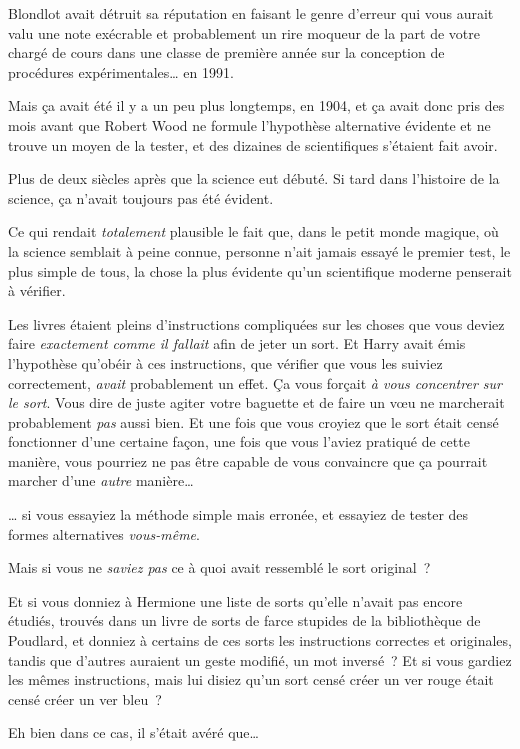 Blondlot avait détruit sa réputation en faisant le genre d'erreur qui vous aurait valu une note exécrable et probablement un rire moqueur de la part de votre chargé de cours dans une classe de première année sur la conception de procédures expérimentales… en 1991.

Mais ça avait été il y a un peu plus longtemps, en 1904, et ça avait donc pris des mois avant que Robert Wood ne formule l'hypothèse alternative évidente et ne trouve un moyen de la tester, et des dizaines de scientifiques s'étaient fait avoir.

Plus de deux siècles après que la science eut débuté.
Si tard dans l'histoire de la science, ça n'avait toujours pas été évident.

Ce qui rendait \emph{totalement} plausible le fait que, dans le petit monde magique, où la science semblait à peine connue, personne n'ait jamais essayé le premier test, le plus simple de tous, la chose la plus évidente qu'un scientifique moderne penserait à vérifier.

Les livres étaient pleins d'instructions compliquées sur les choses que vous deviez faire \emph{exactement comme il fallait} afin de jeter un sort.
Et Harry avait émis l'hypothèse qu'obéir à ces instructions, que vérifier que vous les suiviez correctement, \emph{avait} probablement un effet.
Ça vous forçait \emph{à vous concentrer sur le sort}.
Vous dire de juste agiter votre baguette et de faire un vœu ne marcherait probablement \emph{pas} aussi bien.
Et une fois que vous croyiez que le sort était censé fonctionner d'une certaine façon, une fois que vous l'aviez pratiqué de cette manière, vous pourriez ne pas être capable de vous convaincre que ça pourrait marcher d'une \emph{autre} manière…

… si vous essayiez la méthode simple mais erronée, et essayiez de tester des formes alternatives \emph{vous-même}.

Mais si vous ne \emph{saviez pas} ce à quoi avait ressemblé le sort original~?

Et si vous donniez à Hermione une liste de sorts qu'elle n'avait pas encore étudiés, trouvés dans un livre de sorts de farce stupides de la bibliothèque de Poudlard, et donniez à certains de ces sorts les instructions correctes et originales, tandis que d'autres auraient un geste modifié, un mot inversé~?
Et si vous gardiez les mêmes instructions, mais lui disiez qu'un sort censé créer un ver rouge était censé créer un ver bleu~?

Eh bien dans ce cas, il s'était avéré que…

